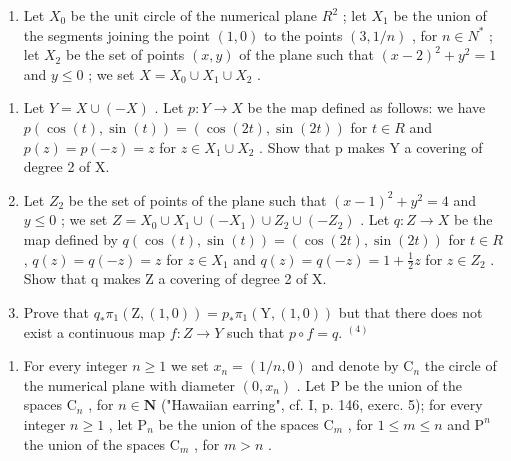 \begin{enumerate}
\def\labelenumi{\arabic{enumi})}
\setcounter{enumi}{4}
\tightlist
\item
  Let \(X_{0}\) be the unit circle of the numerical plane \(R^{2}\) ; let \(X_{1}\) be the union of the segments joining the point \((1,0)\) to the points \((3,1/n)\) , for \(n \in N^{*}\) ; let \(X_{2}\) be the set of points \((x,y)\) of the plane such that \((x-2)^{2} + y^{2} = 1\) and \(y \leqslant 0\) ; we set \(X = X_{0} \cup X_{1} \cup X_{2}\) .
\end{enumerate}

\begin{enumerate}
\def\labelenumi{\alph{enumi})}
\item
  Let \(Y = X \cup (-X)\) . Let \(p: Y \to X\) be the map defined as follows: we have \(p(\cos(t), \sin(t)) = (\cos(2t), \sin(2t))\) for \(t \in R\) and \(p(z) = p(-z) = z\) for \(z \in X_{1} \cup X_{2}\) . Show that p makes Y a covering of degree 2 of X.
\item
  Let \(Z_{2}\) be the set of points of the plane such that \((x-1)^{2}+y^{2}=4\) and \(y\leqslant0\) ; we set \(Z=X_{0}\cup X_{1}\cup(-X_{1})\cup Z_{2}\cup(-Z_{2})\) . Let \(q:Z\to X\) be the map defined by \(q(\cos(t),\sin(t))=(\cos(2t),\sin(2t))\) for \(t\in R\) , \(q(z)=q(-z)=z\) for \(z\in X_{1}\) and \(q(z)=q(-z)=1+\frac{1}{2}z\) for \(z\in Z_{2}\) . Show that q makes Z a covering of degree 2 of X.
\item
  Prove that \(q_{*}\pi_{1}(\mathrm{Z},(1,0)) = p_{*}\pi_{1}(\mathrm{Y},(1,0))\) but that there does not exist a continuous map \(f\colon Z \to Y\) such that \(p \circ f = q\). \(^{(4)}\)
\end{enumerate}

\begin{enumerate}
\def\labelenumi{\arabic{enumi})}
\setcounter{enumi}{5}
\tightlist
\item
  For every integer \(n \geqslant 1\) we set \(x_{n} = (1/n,0)\) and denote by \(\mathrm{C}_{n}\) the circle of the numerical plane with diameter \((0,x_{n})\) . Let P be the union of the spaces \(\mathrm{C}_{n}\) , for \(n \in \mathbf{N}\) ("Hawaiian earring", cf. I, p. 146, exerc. 5); for every integer \(n \geqslant 1\) , let \(\mathrm{P}_{n}\) be the union of the spaces \(\mathrm{C}_{m}\) , for \(1 \leqslant m \leqslant n\) and \(\mathrm{P}^{n}\) the union of the spaces \(\mathrm{C}_{m}\) , for \(m > n\) .
\end{enumerate}

